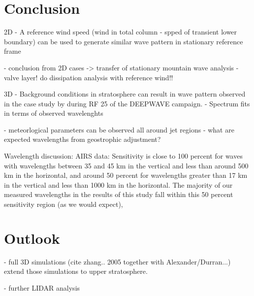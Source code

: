 \chapter{Conclusion}


2D
- A reference wind speed (wind in total column - spped of transient lower boundary) can be used to generate similar wave pattern in stationary reference frame

- conclusion from 2D cases -> transfer of stationary mountain wave analysis
- valve layer! do dissipation analysis with reference wind!!

3D
- Background conditions in stratosphere can result in wave pattern observed in the case study by \cite{dornbrack_stratospheric_2022} during RF 25 of the DEEPWAVE campaign.
- Spectrum fits in terms of observed wavelenghts

- meteorlogical parameters can be observed all around jet regions 
 - what are expected wavelengths from geostrophic adjustment?

Wavelength discussion:
AIRS data:
Sensitivity is close to 100 percent for waves with wavelengths between 35 and 45 km in the vertical and less than around 500 km in the horizontal, and around 50 percent for wavelengths greater than 17 km in the vertical and less than 1000 km in the horizontal. The majority of our measured wavelengths in the results of this study fall within this 50 percent sensitivity region (as we would expect),




\chapter{Outlook}

- full 3D simulations (cite zhang.. 2005 together with Alexander/Durran...) extend those simulations to upper stratosphere.

- further LIDAR analysis